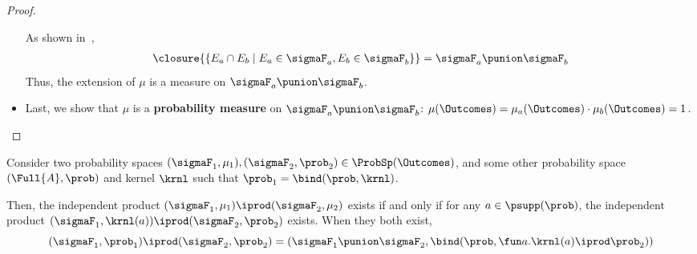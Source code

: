 \documentclass[acmsmall,nonacm,screen,appendix]{acmart}
\begin{document}
\begin{proof}
\begin{itemize}
\begin{itemize}
   \end{itemize}

     As shown in~\cite{lilac},
\begin{align}
      \closure{\{E_a \cap E_b \mid E_a \in \sigmaF_a, E_b \in \sigmaF_b\}}
     = \sigmaF_a \punion \sigmaF_b
     \end{align}
Thus, the extension of $\mu$ is a measure on $\sigmaF_a \punion \sigmaF_b$.

    \item Last, we show that $\mu$ is a \textbf{probability measure} on
     $\sigmaF_a \punion \sigmaF_b$:
     $\mu(\Outcomes) = \mu_a(\Outcomes) \cdot \mu_b(\Outcomes) = 1$.
    \qedhere
 \end{itemize}
 \end{proof}

 \begin{lemma}
  \label{lemma:fibre-prod-exists}
    Consider two probability spaces
  $(\sigmaF_1, \mu_1), (\sigmaF_2, \prob_2) \in \ProbSp(\Outcomes)$,
  and some other probability space $(\Full{A}, \prob)$ and kernel $\krnl$
  such that $\prob_1 = \bind(\prob, \krnl)$.

  Then, the independent product
  $(\sigmaF_1, \mu_1) \iprod (\sigmaF_2, \mu_2)$
  exists if and only if
   for any $a \in \psupp(\prob)$,
   the independent product
   $(\sigmaF_1, \krnl(a)) \iprod (\sigmaF_2, \prob_2)$ exists.
When they both exist,
  \[
   (\sigmaF_1, \prob_1) \iprod (\sigmaF_2, \prob_2)
  = (\sigmaF_1 \punion \sigmaF_2,
     \bind(\prob, \fun a. \krnl(a) \iprod \prob_2))
  \]
 \end{lemma}
\end{document}
